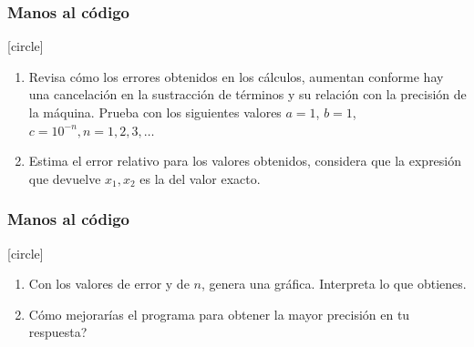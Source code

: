 \begin{frame}
\frametitle{Manos al código}
[circle]
\begin{enumerate}[<+->]
\conti
\item Revisa cómo los errores obtenidos en los cálculos, aumentan conforme hay una cancelación en la sustracción de términos y su relación con la precisión de la máquina. Prueba con los siguientes valores $a=1$, $b=1$, $c=10^{-n}, n = 1, 2, 3, \ldots$
\item Estima el error relativo para los valores obtenidos, considera que la expresión que devuelve $x_{1}, x_{2}$ es la del valor exacto.
\seti
\end{enumerate}
\end{frame}
\begin{frame}
\frametitle{Manos al código}
[circle]
\begin{enumerate}[<+->]
\conti
\item Con los valores de error y de $n$, genera una gráfica. Interpreta lo que obtienes.
\item Cómo mejorarías el programa para obtener la mayor precisión en tu respuesta?
\end{enumerate}
\end{frame}
